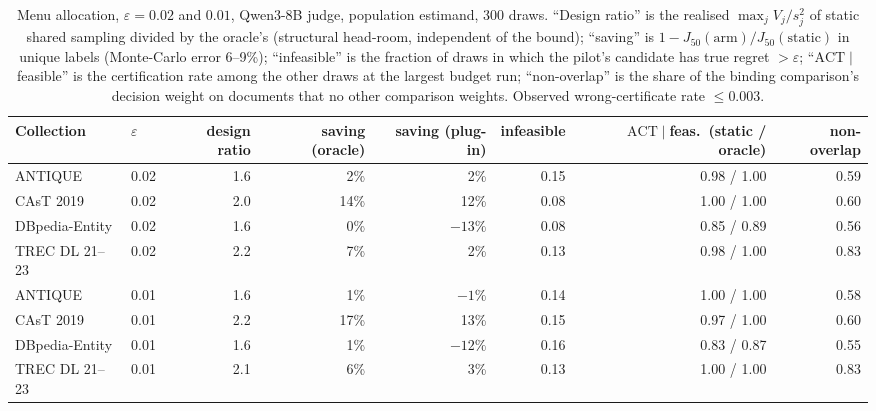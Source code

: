 \documentclass{article}
\newcommand{\eps}{\varepsilon}
\newcommand{\ACT}{\mathrm{ACT}}
\newcommand{\Jfifty}{J_{50}}
\begin{document}
\begin{table}[htbp]\centering\scriptsize\setlength{\tabcolsep}{3pt}
\caption{Menu allocation, $\eps=0.02$ and $0.01$, Qwen3-8B judge, population estimand, 300 draws. ``Design ratio'' is the realised $\max_jV_j/s_j^2$ of static shared sampling divided by the oracle's (structural head-room, independent of the bound); ``saving'' is $1-\Jfifty(\text{arm})/\Jfifty(\text{static})$ in unique labels (Monte-Carlo error 6--9\%); ``infeasible'' is the fraction of draws in which the pilot's candidate has true regret $>\eps$; ``$\ACT\mid$feasible'' is the certification rate among the other draws at the largest budget run; ``non-overlap'' is the share of the binding comparison's decision weight on documents that no other comparison weights. Observed wrong-certificate rate $\le0.003$.}\label{tab:menu}
\begin{tabular}{llrrrrrr}\toprule
Collection & $\eps$ & design ratio & saving (oracle) & saving (plug-in) & infeasible & $\ACT\mid$feas.\ (static / oracle) & non-overlap\\\midrule
ANTIQUE & 0.02 & 1.6 & 2\% & 2\% & 0.15 & 0.98 / 1.00 & 0.59\\
CAsT 2019 & 0.02 & 2.0 & 14\% & 12\% & 0.08 & 1.00 / 1.00 & 0.60\\
DBpedia-Entity & 0.02 & 1.6 & 0\% & $-13\%$ & 0.08 & 0.85 / 0.89 & 0.56\\
TREC DL 21--23 & 0.02 & 2.2 & 7\% & 2\% & 0.13 & 0.98 / 1.00 & 0.83\\\midrule
ANTIQUE & 0.01 & 1.6 & 1\% & $-1\%$ & 0.14 & 1.00 / 1.00 & 0.58\\
CAsT 2019 & 0.01 & 2.2 & 17\% & 13\% & 0.15 & 0.97 / 1.00 & 0.60\\
DBpedia-Entity & 0.01 & 1.6 & 1\% & $-12\%$ & 0.16 & 0.83 / 0.87 & 0.55\\
TREC DL 21--23 & 0.01 & 2.1 & 6\% & 3\% & 0.13 & 1.00 / 1.00 & 0.83\\\bottomrule
\end{tabular}
\end{table}
\end{document}
